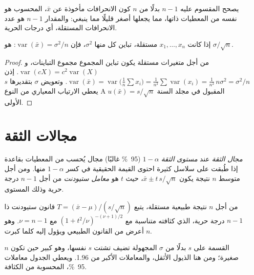 يصحح المقسوم عليه $n - 1$ بدلًا من $n$ كون الانحرافات مأخوذة عن $\bar x$،
المحسوب هو نفسه من المعطيات ذاتها، مما يجعلها أصغر قليلًا مما ينبغي: والمقدار $n - 1$ هو عدد
الانحرافات المستقلة، أي درجات الحرية.

\begin{theorem}\label{thm:b2:measurement-statistics:mean-variance}
إذا كانت $x_1, \dots, x_n$ مستقلة، تباين كل منها $\sigma^2$، فإن $\operatorname{var}(\bar x) =
\sigma^2/n$:  هو $\sigma/\sqrt n$.
\end{theorem}

\begin{proof}
من أجل متغيرات مستقلة يكون تباين المجموع مجموع التباينات، 
و$\operatorname{var}(cX) = c^2\operatorname{var}(X)$. إذن $\operatorname{var}(\bar x) =
\operatorname{var}\bigl(\tfrac1n\sum x_i\bigr) = \tfrac{1}{n^2}\sum\operatorname{var}(x_i) =
\tfrac{1}{n^2}\,n\sigma^2 = \sigma^2/n$. وتعويض $\sigma$ بتقديرها $s$ يعطي الارتياب المعياري
من النوع A $u(\bar x) = s/\sqrt n$ المقبول في مجلد السنة الأولى.
\end{proof}

\section{مجالات الثقة}

\begin{definition}\label{def:b2:measurement-statistics:confidence}
\emph{مجال الثقة} عند \emph{مستوى الثقة}
$1 - \alpha$ (95~\% غالبًا) مجال يُحسب من المعطيات بقاعدة إذا طُبقت على
سلاسل كثيرة احتوى القيمة الحقيقية في كسر $1 - \alpha$ منها. ومن أجل متوسط $n$ نتيجة يكون
$\bar x \pm t\,s/\sqrt n$، حيث $t$ هو \emph{معامل ستيودنت}
من أجل $n - 1$ درجة حرية وذلك المستوى.
\end{definition}

\begin{proposition}\label{prop:b2:measurement-statistics:student}
من أجل $n$ نتيجة طبيعية مستقلة، يتبع $T = (\bar x - \mu)/(s/\sqrt n)$ قانون ستيودنت ذا
$n - 1$ درجة حرية، الذي كثافته متناسبة مع $(1 + t^2/\nu)^{-(\nu+1)/2}$ مع
$\nu = n - 1$. وهو أعرض من القانون الطبيعي ويؤول إليه كلما كبرت $n$.
\end{proposition}

\admitted

القسمة على $s$ بدلًا من $\sigma$ المجهولة تضيف تشتت $s$ نفسها، وهو كبير حين تكون $n$
صغيرة؛ ومن هنا الذيول الأثقل، والمعاملات الأكبر من 1.96. ويعطي الجدول معاملات 95~\%،
المحسوبة من الكثافة.


